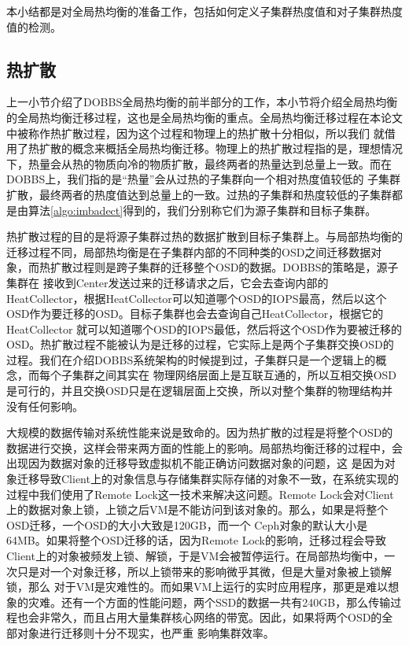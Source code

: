 本小结都是对全局热均衡的准备工作，包括如何定义子集群热度值和对子集群热度值的检测。

\subsection{热扩散}
上一小节介绍了DOBBS全局热均衡的前半部分的工作，本小节将介绍全局热均衡的全局热均衡迁移过程，这也是全局热均衡的重点。全局热均衡迁移过程在本论文中被称作热扩散过程，因为这个过程和物理上的热扩散十分相似，所以我们
就借用了热扩散的概念来概括全局热均衡迁移。物理上的热扩散过程指的是，理想情况下，热量会从热的物质向冷的物质扩散，最终两者的热量达到总量上一致。而在DOBBS上，我们指的是“热量”会从过热的子集群向一个相对热度值较低的
子集群扩散，最终两者的热度值达到总量上的一致。过热的子集群和热度较低的子集群都是由算法\ref{algo:imbadect}得到的，我们分别称它们为源子集群和目标子集群。

热扩散过程的目的是将源子集群过热的数据扩散到目标子集群上。与局部热均衡的迁移过程不同，局部热均衡是在子集群内部的不同种类的OSD之间迁移数据对象，而热扩散过程则是跨子集群的迁移整个OSD的数据。DOBBS的策略是，源子集群在
接收到Center发送过来的迁移请求之后，它会去查询内部的HeatCollector，根据HeatCollector可以知道哪个OSD的IOPS最高，然后以这个OSD作为要迁移的OSD。目标子集群也会去查询自己HeatCollector，根据它的HeatCollector
就可以知道哪个OSD的IOPS最低，然后将这个OSD作为要被迁移的OSD。热扩散过程不能被认为是迁移的过程，它实际上是两个子集群交换OSD的过程。我们在介绍DOBBS系统架构的时候提到过，子集群只是一个逻辑上的概念，而每个子集群之间其实在
物理网络层面上是互联互通的，所以互相交换OSD是可行的，并且交换OSD只是在逻辑层面上交换，所以对整个集群的物理结构并没有任何影响。

大规模的数据传输对系统性能来说是致命的。因为热扩散的过程是将整个OSD的数据进行交换，这样会带来两方面的性能上的影响。局部热均衡迁移的过程中，会出现因为数据对象的迁移导致虚拟机不能正确访问数据对象的问题，这
是因为对象迁移导致Client上的对象信息与存储集群实际存储的对象不一致，在系统实现的过程中我们使用了Remote Lock这一技术来解决这问题。Remote Lock会对Client上的数据对象上锁，上锁之后VM是不能访问到该对象的。那么，如果是将整个OSD迁移，一个OSD的大小大致是120GB，而一个
Ceph对象的默认大小是64MB。如果将整个OSD迁移的话，因为Remote Lock的影响，迁移过程会导致Client上的对象被频发上锁、解锁，于是VM会被暂停运行。在局部热均衡中，一次只是对一个对象迁移，所以上锁带来的影响微乎其微，但是大量对象被上锁解锁，那么
对于VM是灾难性的。而如果VM上运行的实时应用程序，那更是难以想象的灾难。还有一个方面的性能问题，两个SSD的数据一共有240GB，那么传输过程也会非常久，而且占用大量集群核心网络的带宽。因此，如果将两个OSD的全部对象进行迁移则十分不现实，也严重
影响集群效率。

